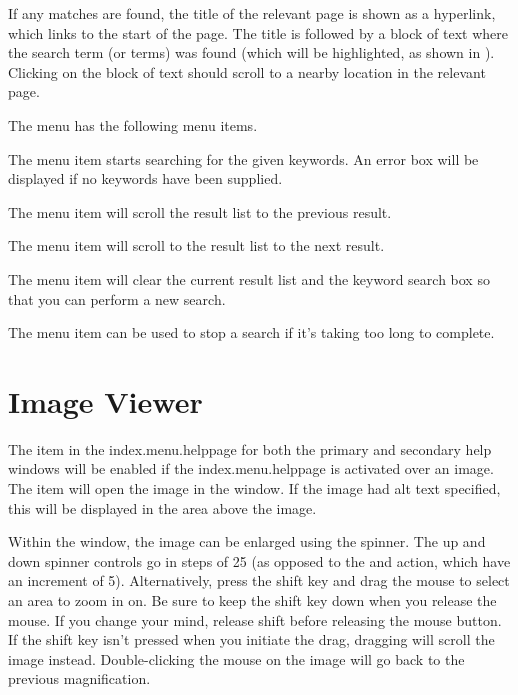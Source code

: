 If any matches are found, the title of the relevant
page is shown as a hyperlink, which links to the start of the page.
The title is followed by a block of text where the search term (or
terms) was found (which will be highlighted, as shown in 
). Clicking on the block of text
should scroll to a nearby location in the relevant page.

The  menu has the following
menu items.

The  menu item starts
searching for the given keywords. An error box will be displayed if
no keywords have been supplied.

The  menu item
will scroll the result list to the previous result.

The  menu item will 
scroll to the result list to the next result.

The  menu item will
clear the current result list and the keyword search box so that you
can perform a new search.

The  menu item can be
used to stop a search if it's taking too long to complete.

\section{Image Viewer}
\label{sec:helpimageviewer}

The  item in the \gls{index.menu.helppage}
for both the primary and secondary help windows will be enabled if
the \gls{index.menu.helppage} is activated over an image. The
 item will open the image in the
 window.  If the image had alt text
specified, this will be displayed in the area above the image.

Within the  window, the image can be enlarged
using the  spinner. The up and down
spinner controls go in steps of 25 (as opposed to the
 and 
action, which have an increment of 5). Alternatively, press the
shift key  and drag the mouse to select an area to
zoom in on. Be sure to keep the shift key down when you release the
mouse. If you change your mind, release shift before releasing the
mouse button. If the shift key isn't pressed when you initiate the
drag, dragging will scroll the image instead. Double-clicking the
mouse on the image will go back to the previous magnification.

